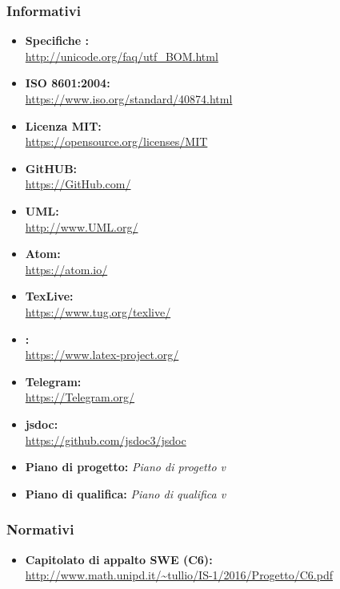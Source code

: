     \subsubsection{Informativi}
      \begin{itemize}
        \item \textbf{Specifiche :}\\
        \url{http://unicode.org/faq/utf_BOM.html}
        \item \textbf{ISO 8601:2004:} \\
        \url{https://www.iso.org/standard/40874.html}\\
        \item \textbf{Licenza MIT:}\\
        \url{https://opensource.org/licenses/MIT}
        \item \textbf{GitHUB:}\\
        \url{https://GitHub.com/}
        \item \textbf{UML:} \\
        \url{http://www.UML.org/}
        \item \textbf{Atom:}\\
        \url{https://atom.io/}
        \item \textbf{TexLive:}\\
        \url{https://www.tug.org/texlive/}
        \item \textbf{\glossaryItem{\LaTeX}:}\\
        \url{https://www.latex-project.org/}
        \item \textbf{Telegram:}\\
        \url{https://Telegram.org/}
        \item \textbf{jsdoc:}\\
        \url{https://github.com/jsdoc3/jsdoc}
        \item \textbf{Piano di progetto:} \emph{Piano di progetto v}\VersionePP{}
        \item \textbf{Piano di qualifica:} \emph{Piano di qualifica v}\VersionePQ{}
      \end{itemize}
    \subsubsection{Normativi}
      \begin{itemize}
        \item \textbf{Capitolato di appalto SWE (C6):}\\
        \url{http://www.math.unipd.it/~tullio/IS-1/2016/Progetto/C6.pdf}
      \end{itemize}

